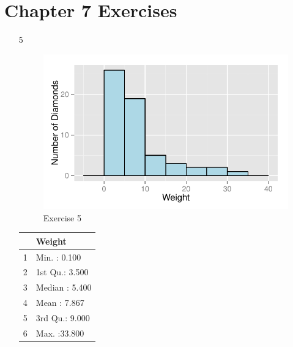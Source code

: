 \documentclass[landscape]{exam}
\begin{document}
  \section{Chapter 7 Exercises}
  \begin{enumerate}
    \item[5]
      \begin{figure}[H]
        \centering
        \includegraphics[scale = 0.8]{figures/ex05.pdf}
        \caption{Exercise 5}
      \end{figure}

      \begin{table}[H]
        \centering
        \begin{tabular}{rl}
          \toprule
                   & Weight \\
          \midrule
          1        & Min.   : 0.100   \\
          2        & 1st Qu.: 3.500   \\
          3        & Median : 5.400   \\
          4        & Mean   : 7.867   \\
          5        & 3rd Qu.: 9.000   \\
          6        & Max.   :33.800   \\
          \bottomrule
        \end{tabular}
      \end{table}


\end{enumerate}
\end{document}
